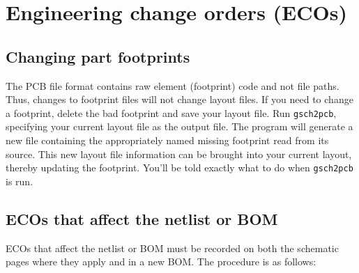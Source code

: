 \section{Engineering change orders (ECOs)}


\subsection{Changing part footprints}
The PCB file format contains raw element (footprint) code and not file paths.  Thus, changes to footprint files will not change layout files.  If you need to change a footprint, delete the bad footprint and save your layout file.  Run \texttt{gsch2pcb}, specifying your current layout file as the output file.  The program will generate a new file containing the appropriately named missing footprint read from its source.  This new layout file information can be brought into your current layout, thereby updating the footprint.  You'll be told exactly what to do when \texttt{gsch2pcb} is run.


\subsection{ECOs that affect the netlist or BOM}
ECOs that affect the netlist or BOM must be recorded on both the schematic pages where they apply and in a new BOM.  The procedure is as follows:
